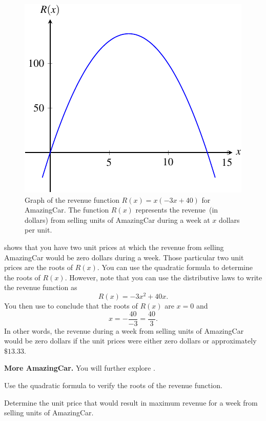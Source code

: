 \documentclass[a4paper,oneside,12pt]{article}
\begin{document}
\begin{solution}
\begin{figure}[!htbp]
\centering
\includegraphics[scale=1.1]{image/10/amazingcar-revenue.pdf}
\caption{%
  Graph of the revenue function $R(x) = x(-3x + 40)$ for AmazingCar.
  The function $R(x)$ represents the revenue~(in dollars) from selling
  units of AmazingCar during a week at $x$ dollars per unit.
}
\label{fig:AmazingCar_revenue}
\end{figure}

 shows that you have two unit prices at
which the revenue from selling AmazingCar would be zero dollars during
a week.  Those particular two unit prices are the roots of $R(x)$.
You can use the quadratic formula to determine the roots of $R(x)$.
However, note that you can use the distributive laws to write the
revenue function as
\begin{equation}
\label{eqn:AmazingCar_revenue_function_distributive}
R(x)
=
-3x^2 + 40x.
\end{equation}
You then use 
to conclude that the roots of $R(x)$ are $x = 0$ and
\[
x
=
-\frac{40}{-3}
=
\frac{40}{3}.
\]
In other words, the revenue during a week from selling units of
AmazingCar would be zero dollars if the unit prices were either zero
dollars or approximately $\$13.33$.
\end{solution}

\begin{exercise}
\textbf{More AmazingCar.}
You will further explore .
\begin{packedenum}
\item\label{subeg:AmazingCar_roots_quadratic_formula}
  Use the quadratic formula to verify the roots of the revenue
  function.

\item\label{subeg:AmazingCar_maximum_revenue}
  Determine the unit price that would result in maximum revenue for a
  week from selling units of AmazingCar.
\end{packedenum}
\end{exercise}
\end{document}
